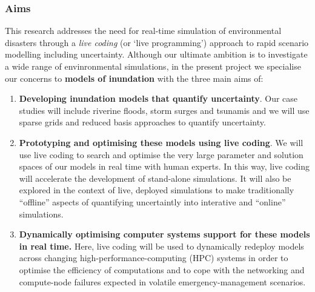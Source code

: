\subsubsection*{Aims}

This research addresses the need for real-time simulation of
environmental disasters through a {\em live coding} (or ‘live programming’)
approach to {rapid scenario modelling including uncertainty}. Although our ultimate ambition is to investigate a wide range of envinronmental simulations, in the present project we specialise our concerns to {\bf models of inundation} with the three main aims of:
\begin{enumerate}

\item {\bf Developing inundation models that quantify uncertainty}. Our case studies will include riverine floods,
  storm surges and tsunamis and we will use sparse grids and reduced basis
  approaches to quantify uncertainty.
  

\item {\bf Prototyping and optimising these models using live coding}. We will use live coding to 
  search and optimise the very large parameter and solution spaces of our models in real time with human 
  experts. 
  In this way, live coding will accelerate the development of stand-alone simulations. It will also be explored in the 
  context of  live, deployed simulations to make traditionally ``offline'' aspects of 
   quantifying uncertaintly into  interative and ``online'' simulations.
  

\item {\bf Dynamically optimising computer systems support for  these models in real time.}
Here, live coding will be used
  to dynamically redeploy models across changing high-performance-computing (HPC) 
  systems in order to optimise the efficiency of computations and 
  to cope with the networking and compute-node failures expected in volatile emergency-management scenarios.

\end{enumerate}

